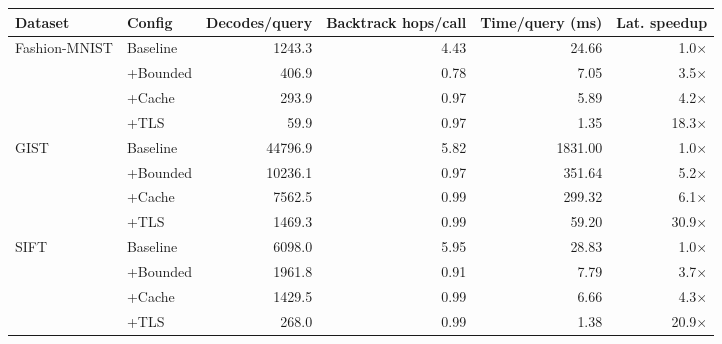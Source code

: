 \begin{tabular}{llrrrr}
\toprule
Dataset & Config & Decodes/query & Backtrack hops/call & Time/query (ms) & Lat. speedup \\
\midrule
Fashion-MNIST & Baseline & 1243.3 & 4.43 & 24.66 & 1.0$\times$ \\
 & +Bounded & 406.9 & 0.78 & 7.05 & 3.5$\times$ \\
 & +Cache & 293.9 & 0.97 & 5.89 & 4.2$\times$ \\
 & +TLS & 59.9 & 0.97 & 1.35 & 18.3$\times$ \\
\midrule
GIST & Baseline & 44796.9 & 5.82 & 1831.00 & 1.0$\times$ \\
 & +Bounded & 10236.1 & 0.97 & 351.64 & 5.2$\times$ \\
 & +Cache & 7562.5 & 0.99 & 299.32 & 6.1$\times$ \\
 & +TLS & 1469.3 & 0.99 & 59.20 & 30.9$\times$ \\
\midrule
SIFT & Baseline & 6098.0 & 5.95 & 28.83 & 1.0$\times$ \\
 & +Bounded & 1961.8 & 0.91 & 7.79 & 3.7$\times$ \\
 & +Cache & 1429.5 & 0.99 & 6.66 & 4.3$\times$ \\
 & +TLS & 268.0 & 0.99 & 1.38 & 20.9$\times$ \\
\bottomrule
\end{tabular}
